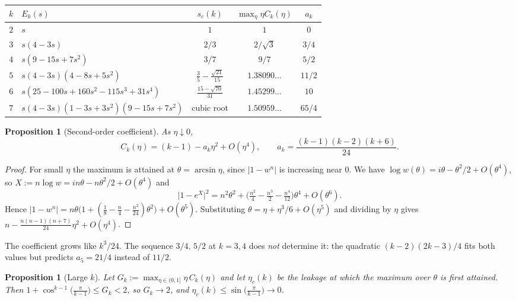 \documentclass[11pt]{amsart}
\newtheorem{proposition}[theorem]{Proposition}
\theoremstyle{definition}
\newcommand{\abs}[1]{\lvert #1\rvert}
\begin{document}
\begin{center}\small
\renewcommand{\arraystretch}{1.2}\setlength{\tabcolsep}{4pt}
\begin{tabular}{c|l|c|c|c}
$k$ & $E_k(s)$ & $s_c(k)$ & $\max_\eta\eta C_k(\eta)$ & $a_k$\\\hline
$2$ & $s$ & $1$ & $1$ & $0$\\
$3$ & $s(4-3s)$ & $2/3$ & $2/\sqrt3$ & $3/4$\\
$4$ & $s(9-15s+7s^2)$ & $3/7$ & $9/7$ & $5/2$\\
$5$ & $s(4-3s)(4-8s+5s^2)$ & $\tfrac35-\tfrac{\sqrt{21}}{15}$ & $1.38090\ldots$ & $11/2$\\
$6$ & $s(25-100s+160s^2-115s^3+31s^4)$ & $\tfrac{15-\sqrt{70}}{31}$ & $1.45299\ldots$ & $10$\\
$7$ & $s(4-3s)(1-3s+3s^2)(9-15s+7s^2)$ & cubic root & $1.50959\ldots$ & $65/4$
\end{tabular}
\end{center}

\begin{proposition}[Second-order coefficient]\label{prop:ak}
As $\eta\downarrow0$,
\[
C_k(\eta)=(k-1)-a_k\eta^2+O(\eta^4),\qquad a_k=\frac{(k-1)(k-2)(k+6)}{24}.
\]
\end{proposition}

\begin{proof}
For small $\eta$ the maximum is attained at $\theta=\arcsin\eta$, since
$\abs{1-w^n}$ is increasing near $0$. We have
$\log w(\theta)=i\theta-\theta^2/2+O(\theta^4)$, so $X:=n\log w=in\theta-n\theta^2/2+O(\theta^4)$
and
\[
\abs{1-e^X}^2=n^2\theta^2+\bigl(\tfrac{n^2}4-\tfrac{n^3}2-\tfrac{n^4}{12}\bigr)\theta^4+O(\theta^6).
\]
Hence $\abs{1-w^n}=n\theta\bigl(1+(\tfrac18-\tfrac n4-\tfrac{n^2}{24})\theta^2\bigr)+O(\theta^5)$.
Substituting $\theta=\eta+\eta^3/6+O(\eta^5)$ and dividing by $\eta$ gives
$n-\frac{n(n-1)(n+7)}{24}\eta^2+O(\eta^4)$.
\end{proof}

The coefficient grows like $k^3/24$. The sequence $3/4,\,5/2$ at $k=3,4$ does
\emph{not} determine it: the quadratic $(k-2)(2k-3)/4$ fits both values but predicts
$a_5=21/4$ instead of $11/2$.

\begin{proposition}[Large $k$]\label{prop:largek}
Let $G_k:=\max_{\eta\in(0,1]}\eta\,C_k(\eta)$ and let $\eta_c(k)$ be the leakage at
which the maximum over $\theta$ is first attained. Then
$1+\cos^{k-1}\bigl(\tfrac{\pi}{k-1}\bigr)\le G_k<2$, so $G_k\to2$, and
$\eta_c(k)\le\sin\bigl(\tfrac{\pi}{k-1}\bigr)\to0$.
\end{proposition}
\end{document}

